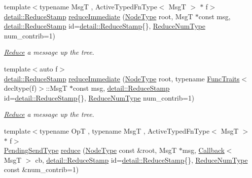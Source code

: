 \begin{DoxyCompactItemize}
\item 
{\footnotesize template$<$typename MsgT , Active\+Typed\+Fn\+Type$<$ Msg\+T $>$ $\ast$ f$>$ }\\\hyperlink{namespacevt_1_1collective_1_1reduce_1_1detail_abcd205dec83706f347d55c7528bf2664}{detail\+::\+Reduce\+Stamp} \hyperlink{structvt_1_1collective_1_1reduce_1_1_reduce_ae21e839a2347ee8ac5ee37c09ff6f4ff}{reduce\+Immediate} (\hyperlink{namespacevt_a866da9d0efc19c0a1ce79e9e492f47e2}{Node\+Type} root, MsgT $\ast$const msg, \hyperlink{namespacevt_1_1collective_1_1reduce_1_1detail_abcd205dec83706f347d55c7528bf2664}{detail\+::\+Reduce\+Stamp} id=\hyperlink{namespacevt_1_1collective_1_1reduce_1_1detail_abcd205dec83706f347d55c7528bf2664}{detail\+::\+Reduce\+Stamp}\{\}, \hyperlink{structvt_1_1collective_1_1reduce_1_1_reduce_a6c3e63aca10c31d2823b0b18cf9762a4}{Reduce\+Num\+Type} num\+\_\+contrib=1)
\begin{DoxyCompactList}\small\item\em \hyperlink{structvt_1_1collective_1_1reduce_1_1_reduce}{Reduce} a message up the tree. \end{DoxyCompactList}\item 
{\footnotesize template$<$auto f$>$ }\\\hyperlink{namespacevt_1_1collective_1_1reduce_1_1detail_abcd205dec83706f347d55c7528bf2664}{detail\+::\+Reduce\+Stamp} \hyperlink{structvt_1_1collective_1_1reduce_1_1_reduce_af5e43f2caafa73dd5941c13857e97a7e}{reduce\+Immediate} (\hyperlink{namespacevt_a866da9d0efc19c0a1ce79e9e492f47e2}{Node\+Type} root, typename \hyperlink{structvt_1_1_func_traits}{Func\+Traits}$<$ decltype(f)$>$\+::MsgT $\ast$const msg, \hyperlink{namespacevt_1_1collective_1_1reduce_1_1detail_abcd205dec83706f347d55c7528bf2664}{detail\+::\+Reduce\+Stamp} id=\hyperlink{namespacevt_1_1collective_1_1reduce_1_1detail_abcd205dec83706f347d55c7528bf2664}{detail\+::\+Reduce\+Stamp}\{\}, \hyperlink{structvt_1_1collective_1_1reduce_1_1_reduce_a6c3e63aca10c31d2823b0b18cf9762a4}{Reduce\+Num\+Type} num\+\_\+contrib=1)
\begin{DoxyCompactList}\small\item\em \hyperlink{structvt_1_1collective_1_1reduce_1_1_reduce}{Reduce} a message up the tree. \end{DoxyCompactList}\item 
{\footnotesize template$<$typename OpT , typename MsgT , Active\+Typed\+Fn\+Type$<$ Msg\+T $>$ $\ast$ f$>$ }\\\hyperlink{structvt_1_1collective_1_1reduce_1_1_reduce_a0474b491f3c93014d9a0ce0356c6bfd5}{Pending\+Send\+Type} \hyperlink{structvt_1_1collective_1_1reduce_1_1_reduce_a3630a98801fa91fd9a0e5ffdf8731650}{reduce} (\hyperlink{namespacevt_a866da9d0efc19c0a1ce79e9e492f47e2}{Node\+Type} const \&root, MsgT $\ast$msg, \hyperlink{namespacevt_a57b238783d05de96bc2c4027f7073b7f}{Callback}$<$ MsgT $>$ cb, \hyperlink{namespacevt_1_1collective_1_1reduce_1_1detail_abcd205dec83706f347d55c7528bf2664}{detail\+::\+Reduce\+Stamp} id=\hyperlink{namespacevt_1_1collective_1_1reduce_1_1detail_abcd205dec83706f347d55c7528bf2664}{detail\+::\+Reduce\+Stamp}\{\}, \hyperlink{structvt_1_1collective_1_1reduce_1_1_reduce_a6c3e63aca10c31d2823b0b18cf9762a4}{Reduce\+Num\+Type} const \&num\+\_\+contrib=1)

\end{DoxyCompactItemize}
